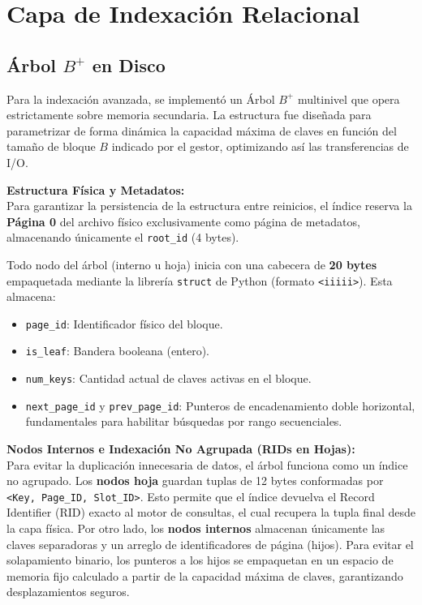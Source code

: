 \documentclass[a4paper,12pt]{article}
\begin{document}
\section{Capa de Indexación Relacional}
\subsection{Árbol $B^+$ en Disco}

Para la indexación avanzada, se implementó un Árbol $B^+$ multinivel que opera
estrictamente sobre memoria secundaria. La estructura fue diseñada para
parametrizar de forma dinámica la capacidad máxima de claves en función del tamaño
de bloque $B$ indicado por el gestor, optimizando así las transferencias de I/O.

\textbf{Estructura Física y Metadatos:} \\
Para garantizar la persistencia de la estructura entre reinicios, el índice reserva
la \textbf{Página 0} del archivo físico exclusivamente como página de metadatos,
almacenando únicamente el \texttt{root\_id} (4 bytes).

Todo nodo del árbol (interno u hoja) inicia con una cabecera de \textbf{20 bytes} empaquetada
mediante la librería \texttt{struct} de Python (formato \texttt{<iiiii>}). Esta
almacena:
\begin{itemize}
    \item \texttt{page\_id}: Identificador físico del bloque.
    \item \texttt{is\_leaf}: Bandera booleana (entero).
    \item \texttt{num\_keys}: Cantidad actual de claves activas en el bloque.
    \item \texttt{next\_page\_id} y \texttt{prev\_page\_id}: Punteros de encadenamiento
    doble horizontal, fundamentales para habilitar búsquedas por rango secuenciales.
\end{itemize}

\textbf{Nodos Internos e Indexación No Agrupada (RIDs en Hojas):} \\
Para evitar la duplicación innecesaria de datos, el árbol funciona como un índice no agrupado.
Los \textbf{nodos hoja} guardan tuplas de 12 bytes conformadas por \texttt{<Key, Page\_ID, Slot\_ID>}.
Esto permite que el índice devuelva el Record Identifier (RID) exacto al motor
de consultas, el cual recupera la tupla final desde la capa física.
Por otro lado, los \textbf{nodos internos} almacenan únicamente las claves separadoras y un arreglo de
identificadores de página (hijos). Para evitar el solapamiento binario, los punteros a los hijos
se empaquetan en un espacio de memoria fijo calculado a partir de la capacidad máxima de claves, garantizando desplazamientos seguros.
\end{document}
